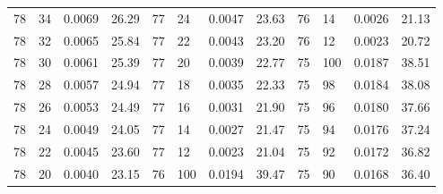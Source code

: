 \begin{tabular}{llll|llll|llll}
78 & 34 & 0.0069 & 26.29 & 77 & 24 & 0.0047 & 23.63 & 76 & 14 & 0.0026 & 21.13\\
78 & 32 & 0.0065 & 25.84 & 77 & 22 & 0.0043 & 23.20 & 76 & 12 & 0.0023 & 20.72\\
78 & 30 & 0.0061 & 25.39 & 77 & 20 & 0.0039 & 22.77 & 75 & 100 & 0.0187 & 38.51\\
78 & 28 & 0.0057 & 24.94 & 77 & 18 & 0.0035 & 22.33 & 75 & 98 & 0.0184 & 38.08\\
78 & 26 & 0.0053 & 24.49 & 77 & 16 & 0.0031 & 21.90 & 75 & 96 & 0.0180 & 37.66\\
78 & 24 & 0.0049 & 24.05 & 77 & 14 & 0.0027 & 21.47 & 75 & 94 & 0.0176 & 37.24\\
78 & 22 & 0.0045 & 23.60 & 77 & 12 & 0.0023 & 21.04 & 75 & 92 & 0.0172 & 36.82\\
78 & 20 & 0.0040 & 23.15 & 76 & 100 & 0.0194 & 39.47 & 75 & 90 & 0.0168 & 36.40\\
\bottomrule
\end{tabular}
\newpage

